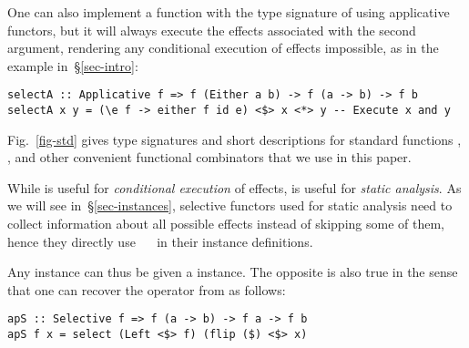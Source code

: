 One can also implement a function with the type signature of  using
applicative functors, but it will always execute the effects associated with the
second argument, rendering any conditional execution of effects impossible, as
in the  example in~\S\ref{sec-intro}:

\vspace{1mm}
\begin{verbatim}
selectA :: Applicative f => f (Either a b) -> f (a -> b) -> f b
selectA x y = (\e f -> either f id e) <$> x <*> y -- Execute x and y
\end{verbatim}
\vspace{1mm}

\noindent
Fig.~\ref{fig-std} gives type signatures and short descriptions for standard
functions , , and other convenient functional combinators that
we use in this paper.

While  is useful for \emph{conditional execution} of effects,
 is useful for \emph{static analysis}. As we will see
in~\S\ref{sec-instances}, selective functors used for static analysis need to
collect information about all possible effects instead of skipping some of them,
hence they directly use ~\hs{=}~ in their 
instance definitions.

Any  instance can thus be given a  instance. The
opposite is also true in the sense that one can recover the operator \hs{<*>}
from  as follows:

\vspace{1mm}
\begin{verbatim}
apS :: Selective f => f (a -> b) -> f a -> f b
apS f x = select (Left <$> f) (flip ($) <$> x)
\end{verbatim}
\vspace{1mm}


